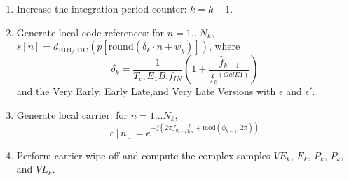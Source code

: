 \begin{enumerate}
  \item Increase the integration period counter: $k = k + 1$.
  \item Generate local code references: for $n = 1...N_k$, $s[n] = d_{\text{E1B/E1C}} \left( p[\text{round}(\delta_k \cdot n + \psi_k)] \right)$, where
  \[ \delta_k =\frac{1}{T_c,E_1B.f_{IN}}(1+\frac{\hat{f}_{k-1}}{{f_c}^{(Gal E1)}})\]
  and the Very Early, Early Late,and Very Late Versions with $\epsilon$ and $\epsilon'$.
  \item  Generate local carrier: for $n = 1...N_k$,
\[ c[n] = e^{-j (2\pi \hat{f}_{d_{k-1}}\frac{n}{\text{f}_{IN}}+ \text{mod}(\hat{\phi}_{k-1}, 2\pi))}  \]
  \item Perform carrier wipe-off and compute the complex samples $VE_k$, $E_k$, $P_k$, $P_k$, and $VL_k$.
 

\end{enumerate}
